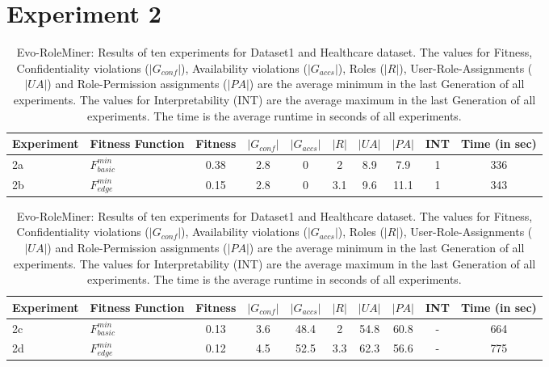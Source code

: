 \section{Experiment 2}
\label{sec:A_Exp2}
	\begin{table}[H]
		\centering
		\caption{Evo-RoleMiner: Results of ten experiments for Dataset1 and Healthcare dataset. The values for Fitness, Confidentiality violations ($|G_{conf}|$), Availability violations ($|G_{accs}|$), Roles ($|R|$), User-Role-Assignments ($|UA|$) and Role-Permission assignments ($|PA|$) are the average minimum in the last Generation of all experiments. The values for Interpretability (INT) are the average maximum in the last Generation of all experiments. The time is the average runtime in seconds of all experiments.}
		\label{tab:exp2_results}
		\begin{adjustbox}{width=\textwidth}
			\begin{tabular}{|l|l|c|c|c|c|c|c|c|c|}
				\hline
				\rowcolor{myGray} 
				\textbf{Experiment} & \textbf{Fitness Function} & \textbf{Fitness} & \textbf{$|G_{conf}|$} & \textbf{$|G_{accs}|$} & \textbf{$|R|$} & \textbf{$|UA|$} & \textbf{$|PA|$} & \textbf{INT} & \textbf{Time (in sec)}\\ \hline
				2a & $F_{basic}^{min}$ &   0.38   &   2.8   &   0   &   2   &   8.9   &   7.9   &  1   &   336\\ \hline
				2b & $F_{edge}^{min}$ &    0.15    &   2.8   &   0   &   3.1   &   9.6   &   11.1   &   1   &   343\\ \hline 
			\end{tabular}
		\end{adjustbox}
		\bigskip
		\begin{adjustbox}{width=\textwidth}
			\begin{tabular}{|l|l|c|c|c|c|c|c|c|c|}
				\hline
				\rowcolor{myGray} 
				\textbf{Experiment} & \textbf{Fitness Function} & \textbf{Fitness} & \textbf{$|G_{conf}|$} & \textbf{$|G_{accs}|$} & \textbf{$|R|$} & \textbf{$|UA|$} & \textbf{$|PA|$} & \textbf{INT} & \textbf{Time (in sec)}\\ \hline
				2c & $F_{basic}^{min}$ &   0.13   &   3.6   &   48.4   &   2   &   54.8   &   60.8   &   -   & 664\\ \hline
				2d & $F_{edge}^{min}$ &   0.12   &   4.5   &   52.5   &   3.3   &   62.3   &   56.6   &   -   & 775\\ \hline
			\end{tabular}
		\end{adjustbox}
	\end{table}
	
